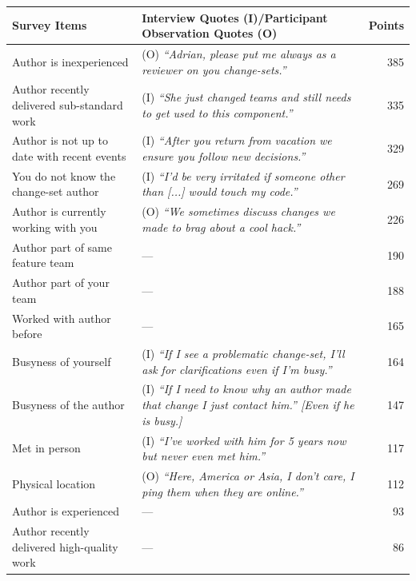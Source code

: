 \documentclass{sig-alternate}
\begin{document}
\begin{table}[tbh!]
{\begin{tabular}{@{}l@{\hspace{5pt}}l@{\hspace{-5pt}}r@{}}
\toprule
Survey Items & Interview Quotes (I)/Participant Observation Quotes (O) & Points\\
\midrule
Author is inexperienced &(O) \emph{``Adrian, please put me always as a reviewer on you change-sets.''}& 385\\
Author recently delivered sub-standard work&(I) \emph{``She just changed teams and still needs to get used to this component.''}& 335\\
Author is not up to date with recent events &(I) \emph{``After you return from vacation we ensure you follow new decisions.''}& 329\\ 
You do not know the change-set author &(I) \emph{``I'd be very irritated if someone other than [...] would touch my code.''}& 269\\	
Author is currently working with you &(O) \emph{``We sometimes discuss changes we made to brag about a cool hack.''}& 226\\	
Author part of same feature team &--- & 190\\ 	
Author part of your team &--- & 188\\ 		
Worked with author before &--- & 165\\ 			
Busyness of yourself &(I) \emph{``If I see a problematic change-set, I'll ask for clarifications even if I'm busy.''}& 164\\
Busyness of the author &(I) {\small\emph{``If I need to know why an author made that change I just contact him.'' [Even if he is busy.]}}& 147\\
 Met in person &(I) \emph{``I've worked with him for 5 years now but never even met him.''}& 117\\
 Physical location &(O) \emph{``Here, America or Asia, I don't care, I ping them when they are online.''}& 112\\ 
 Author is experienced &--- & 93\\ %
 Author recently delivered high-quality work&--- & 86\\%
\bottomrule
\end{tabular}
\label{tab:sub-social}
}\vspace{20pt}
\end{table}
\end{document}
